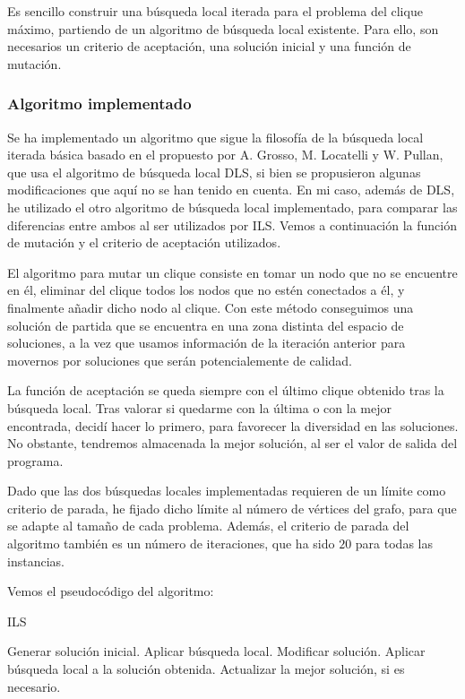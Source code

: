 Es sencillo construir una búsqueda local iterada para el problema del clique máximo,
partiendo de un algoritmo de búsqueda local existente. Para ello, son necesarios un
criterio de aceptación, una solución inicial y una función de mutación.

\subsubsection{Algoritmo implementado}

Se ha implementado un algoritmo que sigue la filosofía de la búsqueda local iterada
básica basado en el propuesto por A. Grosso, M. Locatelli y W. Pullan, que usa el
algoritmo de búsqueda local DLS, si bien se propusieron algunas modificaciones que
aquí no se han tenido en cuenta. En mi caso, además de DLS, he utilizado el otro
algoritmo de búsqueda local implementado, para comparar las diferencias entre ambos
al ser utilizados por ILS. Vemos a continuación la función de mutación y el criterio
de aceptación utilizados.

El algoritmo para mutar un clique consiste en tomar un nodo que no se encuentre en él,
eliminar del clique todos los nodos que no estén conectados a él, y finalmente añadir
dicho nodo al clique. Con este método conseguimos una solución de partida que se encuentra
en una zona distinta del espacio de soluciones, a la vez que usamos información de la
iteración anterior para movernos por soluciones que serán potencialemente de calidad.

La función de aceptación se queda siempre con el último clique obtenido tras la búsqueda local.
Tras valorar si quedarme con la última o con la mejor encontrada, decidí hacer lo primero,
para favorecer la diversidad en las soluciones. No obstante, tendremos almacenada la mejor
solución, al ser el valor de salida del programa.

Dado que las dos búsquedas locales implementadas requieren de un límite como criterio de
parada, he fijado dicho límite al número de vértices del grafo, para que se adapte al
tamaño de cada problema. Además, el criterio de parada del algoritmo también es un número
de iteraciones, que ha sido $20$ para todas las instancias.

Vemos el pseudocódigo del algoritmo:

\begin{algorithm}[H]
\caption{ILS}
  \begin{algorithmic}
    \State Generar solución inicial.
    \State Aplicar búsqueda local.
    \Repeat
      \State Modificar solución.
      \State Aplicar búsqueda local a la solución obtenida.
      \State Actualizar la mejor solución, si es necesario.
  \end{algorithmic}
\end{algorithm}

